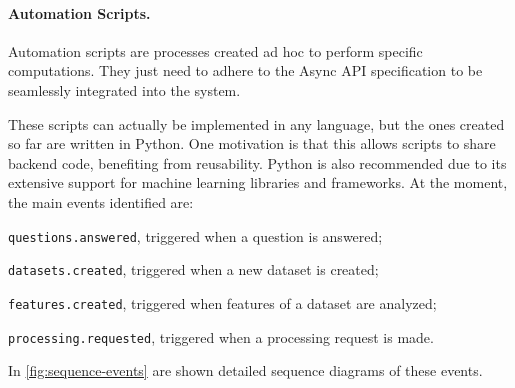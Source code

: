 \documentclass[12pt,a4paper,openright,twoside]{book}
\begin{document}
\paragraph{Automation Scripts.}

Automation scripts are processes created ad hoc to perform specific computations.
%
They just need to adhere to the Async API specification to be seamlessly integrated into the system.
%

These scripts can actually be implemented in any language, but the ones created so far are written in Python.
%
One motivation is that this allows scripts to share backend code, benefiting from reusability.
%
Python is also recommended due to its extensive support for machine learning libraries and frameworks.
%
At the moment, the main events identified are:
\begin{enumerate*}[label=(\roman*)]
    \item \texttt{questions.answered}, triggered when a question is answered;
    \item \texttt{datasets.created}, triggered when a new dataset is created;
    \item \texttt{features.created}, triggered when features of a dataset are analyzed;
    \item \texttt{processing.requested}, triggered when a processing request is made.
\end{enumerate*}

In \cref{fig:sequence-events} are shown detailed sequence diagrams of these events. 
\end{document}
